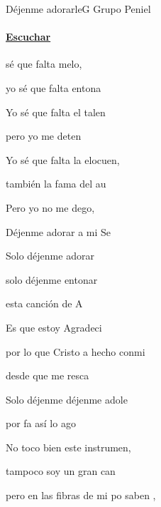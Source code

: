 \documentclass[12pt, spanish]{book}
\newcommand{\NotCCLIed}{\relax}
\begin{document}
    \begin{song}{Déjenme adorarle}{G}
    {} %
    {Grupo Peniel}
    {} %
    {} %
        \ifChordBk
        \paragraph{\mbox{}\hfill\protect\href{https://open.spotify.com/intl-es/track/5aIcMjS8UvZtCFglFwQJdd}{Escuchar}\mbox{}\hfill}
        \fi

        \begin{SBOpGroup}
             sé que falta melo,

            yo sé que falta entona

            Yo sé que falta el talen

            pero yo  me deten

            Yo sé que falta la elocuen,

            también la fama del au

            Pero yo no me dego,

            Déjenme adorar a mi Se
        \end{SBOpGroup}

        \begin{SBChorus}
            Solo déjenme adorar

            solo déjenme entonar

            esta canción de A

            Es que estoy Agradeci

            por lo que Cristo a hecho conmi

            desde que me resca
        \end{SBChorus}

        \begin{SBOpGroup}
            Solo déjenme déjenme adole

            por fa así lo ago 
        \end{SBOpGroup}

        \begin{SBOpGroup}
            No toco bien este instrumen,

            tampoco soy un gran can

            pero en las fibras de mi po saben ,


\end{SBOpGroup}
\end{song}
\end{document}
